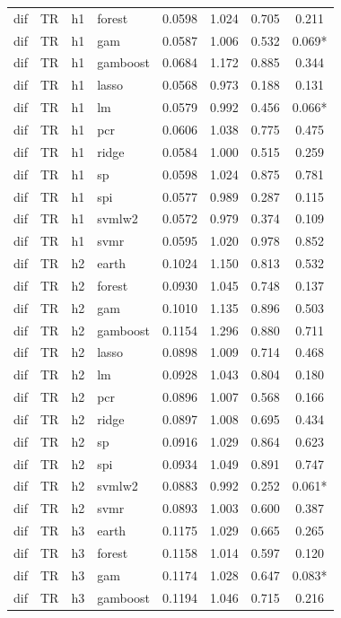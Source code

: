 \begin{ThreePartTable}
\begin{longtable}[t]{llclcccc}
dif & TR & h1 & forest & 0.0598 & 1.024 & 0.705 & 0.211\\
dif & TR & h1 & gam & 0.0587 & 1.006 & 0.532 & 0.069*\\
dif & TR & h1 & gamboost & 0.0684 & 1.172 & 0.885 & 0.344\\
dif & TR & h1 & lasso & 0.0568 & 0.973 & 0.188 & 0.131\\
dif & TR & h1 & lm & 0.0579 & 0.992 & 0.456 & 0.066*\\
dif & TR & h1 & pcr & 0.0606 & 1.038 & 0.775 & 0.475\\
dif & TR & h1 & ridge & 0.0584 & 1.000 & 0.515 & 0.259\\
dif & TR & h1 & sp & 0.0598 & 1.024 & 0.875 & 0.781\\
dif & TR & h1 & spi & 0.0577 & 0.989 & 0.287 & 0.115\\
dif & TR & h1 & svmlw2 & 0.0572 & 0.979 & 0.374 & 0.109\\
dif & TR & h1 & svmr & 0.0595 & 1.020 & 0.978 & 0.852\\
\addlinespace
dif & TR & h2 & earth & 0.1024 & 1.150 & 0.813 & 0.532\\
dif & TR & h2 & forest & 0.0930 & 1.045 & 0.748 & 0.137\\
dif & TR & h2 & gam & 0.1010 & 1.135 & 0.896 & 0.503\\
dif & TR & h2 & gamboost & 0.1154 & 1.296 & 0.880 & 0.711\\
dif & TR & h2 & lasso & 0.0898 & 1.009 & 0.714 & 0.468\\
dif & TR & h2 & lm & 0.0928 & 1.043 & 0.804 & 0.180\\
dif & TR & h2 & pcr & 0.0896 & 1.007 & 0.568 & 0.166\\
dif & TR & h2 & ridge & 0.0897 & 1.008 & 0.695 & 0.434\\
dif & TR & h2 & sp & 0.0916 & 1.029 & 0.864 & 0.623\\
dif & TR & h2 & spi & 0.0934 & 1.049 & 0.891 & 0.747\\
dif & TR & h2 & svmlw2 & 0.0883 & 0.992 & 0.252 & 0.061*\\
dif & TR & h2 & svmr & 0.0893 & 1.003 & 0.600 & 0.387\\
\addlinespace
dif & TR & h3 & earth & 0.1175 & 1.029 & 0.665 & 0.265\\
dif & TR & h3 & forest & 0.1158 & 1.014 & 0.597 & 0.120\\
dif & TR & h3 & gam & 0.1174 & 1.028 & 0.647 & 0.083*\\
dif & TR & h3 & gamboost & 0.1194 & 1.046 & 0.715 & 0.216\\

\end{longtable}
\end{ThreePartTable}
